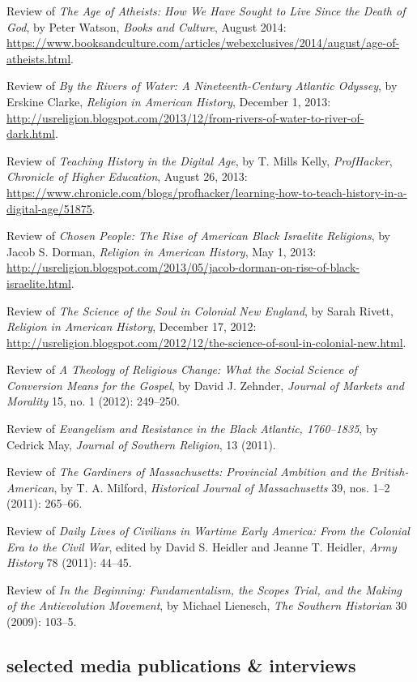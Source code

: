 \documentclass[11pt]{article}
\begin{document}
Review of \emph{The Age of Atheists: How We Have Sought to Live Since
  the Death of God}, by Peter Watson, \emph{Books and Culture}, August
2014: 
\url{https://www.booksandculture.com/articles/webexclusives/2014/august/age-of-atheists.html}.

Review of \emph{By the Rivers of Water: A Nineteenth-Century Atlantic
  Odyssey}, by Erskine Clarke, \emph{Religion in American History},
December 1, 2013: 
\url{http://usreligion.blogspot.com/2013/12/from-rivers-of-water-to-river-of-dark.html}.

Review of \emph{Teaching History in the Digital Age}, by T. Mills Kelly,
\emph{ProfHacker}, \emph{Chronicle of Higher Education}, August 26,
2013: 
\url{https://www.chronicle.com/blogs/profhacker/learning-how-to-teach-history-in-a-digital-age/51875}.

Review of \emph{Chosen People: The Rise of American Black Israelite
  Religions}, by Jacob S. Dorman, \emph{Religion in American History}, May
1, 2013: 
\url{http://usreligion.blogspot.com/2013/05/jacob-dorman-on-rise-of-black-israelite.html}.

Review of \emph{The Science of the Soul in Colonial New England}, by
Sarah Rivett, \emph{Religion in American History}, December 17, 2012: 
\url{http://usreligion.blogspot.com/2012/12/the-science-of-soul-in-colonial-new.html}.

Review of \emph{A Theology of Religious Change: What the Social Science
  of Conversion Means for the Gospel}, by David J. Zehnder, \emph{Journal
  of Markets and Morality} 15, no. 1 (2012): 249--250.

Review of \emph{Evangelism and Resistance in the Black Atlantic,
  1760--1835}, by Cedrick May, \emph{Journal of Southern Religion}, 13
(2011).

Review of \emph{The Gardiners of Massachusetts: Provincial Ambition and
  the British-American}, by T. A. Milford, \emph{Historical Journal of
  Massachusetts} 39, nos. 1--2 (2011): 265--66.

Review of \emph{Daily Lives of Civilians in Wartime Early America: From
  the Colonial Era to the Civil War}, edited by David S. Heidler and
Jeanne T. Heidler, \emph{Army History} 78 (2011): 44--45.

Review of \emph{In the Beginning: Fundamentalism, the Scopes Trial, and
  the Making of the Antievolution Movement}, by Michael Lienesch,
\emph{The Southern Historian} 30 (2009): 103--5.

\subsection{selected media publications \& interviews}\label{public}
\end{document}
